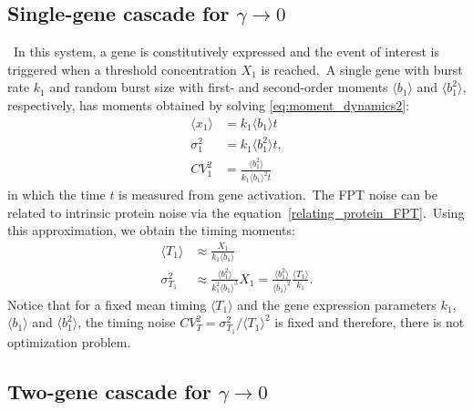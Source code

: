 \documentclass[aps,prb,reprint,superscriptaddress]{revtex4-2}
\begin{document}
\subsection*{Single-gene cascade for $\gamma\rightarrow0$}
~In this system, a gene is constitutively expressed and the event of interest is triggered when a threshold concentration $X_1$ is reached.~A single gene with burst rate $k_1$ and random burst size with first- and second-order moments $\langle b_1\rangle$ and $\langle b^2_1\rangle$, respectively, has moments obtained by solving \eqref{eq:moment_dynamics2}:
\begin{subequations}
\begin{align}\label{eq:momsol}
 \langle x_1\rangle&=k_1\langle b_1\rangle t\\
  \sigma^2_1&=k_1\langle b^2_1\rangle t,\\
   CV^2_1&=\frac{\langle b^2_1\rangle}{k_1\langle b_1\rangle^2t}\label{eq3c}
\end{align}
\end{subequations}
in which the time $t$ is measured from gene activation.~The FPT noise can be related to intrinsic protein noise via the equation~\eqref{relating_protein_FPT}.~Using this approximation, we obtain the timing moments:
\begin{subequations}\label{eq:momsol2}
\begin{align}
\langle T_1\rangle&\approx\frac{X_1}{k_1\langle b_1\rangle}\\
\sigma^2_{T_1}&\approx\frac{\langle b^2_1\rangle}{k_1^2\langle b_1\rangle^3}X_1 =\frac{\langle b^2_1\rangle}{\langle b_1\rangle^2}\frac{\langle T_1\rangle}{k_1}.
\end{align}
\end{subequations}
Notice that for a fixed mean timing $\langle T_1\rangle$ and the gene expression parameters $k_1$,$\langle b_1\rangle$ and $\langle b^2_1\rangle$, the timing noise $CV^ 2_{T}=\sigma^2_{T_1}/\langle T_1\rangle^2$ is fixed and therefore, there is not optimization problem.

\subsection*{Two-gene cascade for $\gamma\rightarrow0$}
\end{document}
